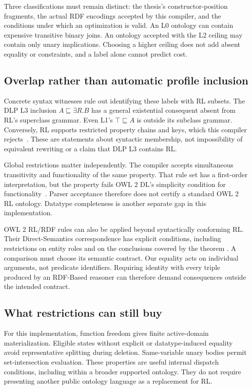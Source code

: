 Three classifications must remain distinct: the thesis's constructor-position
fragments, the actual RDF encodings accepted by this compiler, and the
conditions under which an optimization is valid. An L0 ontology can contain
expensive transitive binary joins. An ontology accepted with the L2 ceiling may
contain only unary implications. Choosing a higher ceiling does not add absent
equality or constraints, and a label alone cannot predict cost.

\subsection{Overlap rather than automatic profile inclusion}
Concrete syntax witnesses rule out identifying these labels with RL subsets.
The DLP L3 inclusion $A\sqsubseteq\exists R.B$ has a general existential
consequent absent from RL's superclass grammar. Even L1's $\top\sqsubseteq A$
is outside its subclass grammar. Conversely, RL supports restricted property
chains and keys, which this compiler rejects~\cite{owlprofiles2012}. These
are statements about syntactic membership, not impossibility of equivalent
rewriting or a claim that DLP L3 contains RL.

Global restrictions matter independently. The compiler accepts simultaneous
transitivity and functionality of the same property. That rule set has a
first-order interpretation, but the property fails OWL 2 DL's simplicity
condition for functionality~\cite{owlsyntax2012}. Parser acceptance therefore
does not certify a standard OWL 2 RL ontology. Datatype completeness is another
separate gap in this implementation.

OWL 2 RL/RDF rules can also be applied beyond syntactically conforming RL.
Their Direct-Semantics correspondence has explicit conditions, including
restrictions on entity roles and on the conclusions covered by the theorem
\cite{owlprofiles2012,owlconformance2012}. A comparison must choose its
semantic contract. Our equality acts on individual arguments, not predicate
identifiers. Requiring identity with every triple produced by an RDF-Based
reasoner can therefore demand consequences outside the intended contract.

\subsection{What restrictions can still buy}
For this implementation, function freedom gives finite active-domain
materialization. Eligible states without explicit or datatype-induced equality
avoid representative splitting during
deletion. Same-variable unary bodies permit set-intersection evaluation.
These properties are useful internal dispatch conditions, including within a
broader supported ontology. They do not require presenting another public
ontology language as a replacement for RL.

